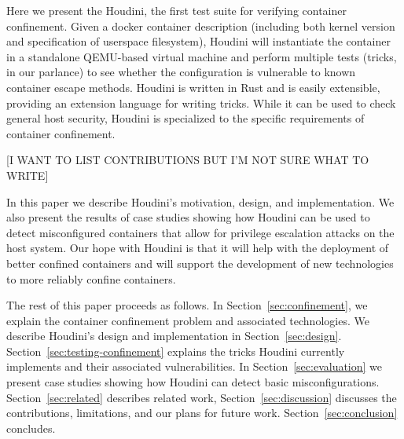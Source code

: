 Here we present the Houdini, the first test suite for verifying container confinement.  Given a docker container description (including both kernel version and specification of userspace filesystem), Houdini will instantiate the container in a standalone QEMU-based virtual machine and perform multiple tests (tricks, in our parlance) to see whether the configuration is vulnerable to known container escape methods.  Houdini is written in Rust and is easily extensible, providing an extension language for writing tricks.  While it can be used to check general host security, Houdini is specialized to the specific requirements of container confinement.

[I WANT TO LIST CONTRIBUTIONS BUT I'M NOT SURE WHAT TO WRITE]

In this paper we describe Houdini's motivation, design, and implementation.  We also present the results of case studies showing how Houdini can be used to detect misconfigured containers that allow for privilege escalation attacks on the host system.  Our hope with Houdini is that it will help with the deployment of better confined containers and will support the development of new technologies to more reliably confine containers.

The rest of this paper proceeds as follows.  In Section~\ref{sec:confinement}, we explain the container confinement problem and associated technologies.  We describe Houdini's design and implementation in Section~\ref{sec:design}. Section~\ref{sec:testing-confinement} explains the tricks Houdini currently implements and their associated vulnerabilities.  In Section~\ref{sec:evaluation} we present case studies showing how Houdini can detect basic misconfigurations.  Section~\ref{sec:related} describes related work, Section~\ref{sec:discussion} discusses the contributions, limitations, and our plans for future work.  Section~\ref{sec:conclusion} concludes.




